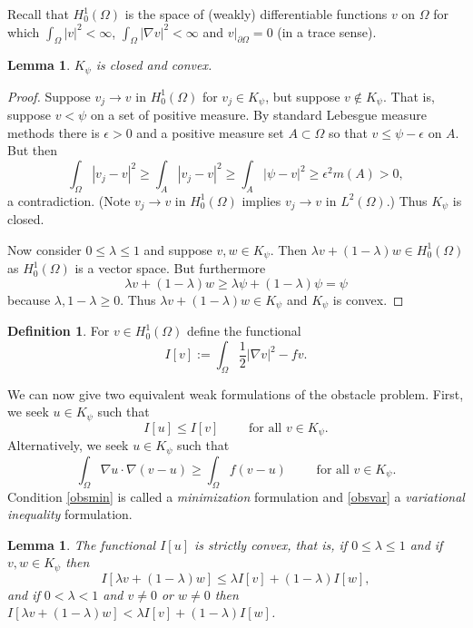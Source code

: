 \documentclass[12pt,final]{amsart}
\newtheorem{lem}[thm]{Lemma}
\theoremstyle{definition}
\newtheorem*{defn}{Definition}
\newcommand{\eps}{\epsilon}
\newcommand{\grad}{\nabla}
\newcommand{\lam}{\lambda}
\begin{document}
Recall that $H_0^1(\Omega)$ is the space of (weakly) differentiable functions $v$ on $\Omega$ for which $\int_\Omega |v|^2 < \infty$, $\int_\Omega |\grad v|^2 <\infty$ and $v\big|_{\partial\Omega}=0$ (in a trace sense).

\begin{lem}\label{obsclosedconvex}  $K_\psi$ is closed and convex.
\end{lem}

\begin{proof}  Suppose $v_j\to v$ in $H_0^1(\Omega)$ for $v_j\in K_\psi$, but suppose $v\notin K_\psi$.  That is, suppose $v < \psi$ on a set of positive measure.  By standard Lebesgue measure methods there is $\eps>0$ and a positive measure set $A\subset \Omega$ so that $v \le \psi-\eps$ on $A$.  But then
    $$\int_\Omega |v_j-v|^2 \ge \int_A |v_j-v|^2 \ge \int_A |\psi-v|^2 \ge \eps^2 m(A) >0,$$
a contradiction.  (Note $v_j\to v$ in $H_0^1(\Omega)$ implies $v_j\to v$ in $L^2(\Omega)$.)  Thus $K_\psi$ is closed.

Now consider $0\le \lam \le 1$ and suppose $v,w\in K_\psi$.  Then $\lam v + (1-\lam)w \in H_0^1(\Omega)$ as $H_0^1(\Omega)$ is a vector space.  But furthermore
    $$\lam v + (1-\lam)w \ge \lam \psi + (1-\lam) \psi = \psi$$
because $\lam,1-\lam\ge 0$.  Thus $\lam v + (1-\lam)w \in K_\psi$ and $K_\psi$ is convex.
\end{proof}

\begin{defn}  For $v\in H_0^1(\Omega)$ define the functional
    $$I[v] := \int_\Omega \frac{1}{2} |\grad v|^2 - f v.$$
\end{defn}

We can now give two equivalent weak formulations of the obstacle problem.  First, we seek $u\in K_\psi$ such that
\begin{equation}\label{obsmin}
I[u] \le I[v] \qquad \text{ for all } v \in K_\psi.
\end{equation}
Alternatively, we seek $u\in K_\psi$ such that
\begin{equation}\label{obsvar}
\int_\Omega \grad u\cdot \grad(v-u) \ge \int_\Omega f(v-u) \qquad \text{ for all } v \in K_\psi.
\end{equation}
Condition \eqref{obsmin} is called a \emph{minimization} formulation and \eqref{obsvar} a \emph{variational inequality} formulation.

\begin{lem}\label{lem:Iconvex} The functional $I[u]$ is strictly convex, that is, if $0\le \lam\le 1$ and if $v,w\in K_\psi$ then
    $$I[\lam v + (1-\lam)w] \le \lam I[v] + (1-\lam) I[w],$$
and if $0<\lam<1$ and $v\ne 0$ or $w\ne 0$ then $I[\lam v + (1-\lam)w] < \lam I[v] + (1-\lam) I[w]$.
\end{lem}
\end{document}
